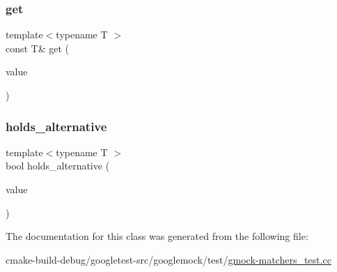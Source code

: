 \subsubsection{\texorpdfstring{get}{get}}
{\footnotesize\ttfamily template$<$typename T $>$ \\
const T\& get (\begin{DoxyParamCaption}\item[{const \mbox{\hyperlink{classtesting_1_1gmock__matchers__test_1_1SampleVariantIntString}{Sample\+Variant\+Int\+String}} \&}]{value }\end{DoxyParamCaption})\hspace{0.3cm}{\ttfamily [friend]}}

\mbox{\label{classtesting_1_1gmock__matchers__test_1_1SampleVariantIntString_a3139754402f0352ddea2ba7823ad16f1}} 
\subsubsection{\texorpdfstring{holds\_alternative}{holds\_alternative}}
{\footnotesize\ttfamily template$<$typename T $>$ \\
bool holds\+\_\+alternative (\begin{DoxyParamCaption}\item[{const \mbox{\hyperlink{classtesting_1_1gmock__matchers__test_1_1SampleVariantIntString}{Sample\+Variant\+Int\+String}} \&}]{value }\end{DoxyParamCaption})\hspace{0.3cm}{\ttfamily [friend]}}



The documentation for this class was generated from the following file\+:\begin{DoxyCompactItemize}
\item 
cmake-\/build-\/debug/googletest-\/src/googlemock/test/\mbox{\hyperlink{gmock-matchers__test_8cc}{gmock-\/matchers\+\_\+test.\+cc}}\end{DoxyCompactItemize}
